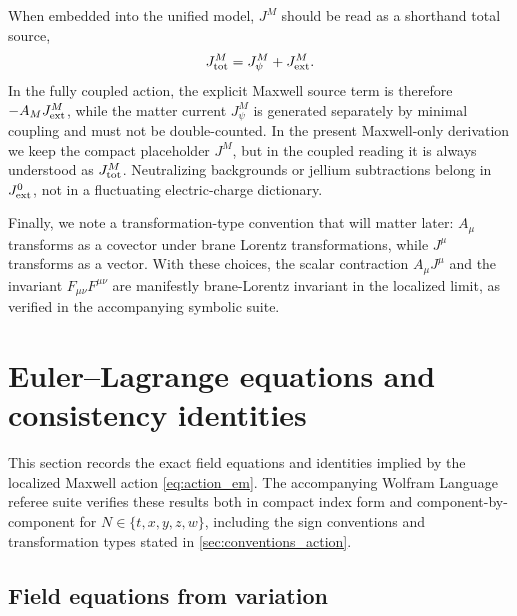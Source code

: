 \documentclass[11pt]{article}
\newcommand{\A}{A}
\newcommand{\F}{F}
\newcommand{\J}{J}
\newcommand{\Jpsi}{J_\psi}
\newcommand{\Jext}{J_{\rm ext}}
\newcommand{\Jtot}{J_{\rm tot}}
\begin{document}
When embedded into the unified model, \(\J^M\) should be read as a shorthand total
source,
\begin{equation}
  \Jtot^M = \Jpsi^M + \Jext^M.
\end{equation}
In the fully coupled action, the explicit Maxwell source term is therefore
\(-\A_M\Jext^M\), while the matter current \(\Jpsi^M\) is generated separately by
minimal coupling and must not be double-counted. In the present Maxwell-only
derivation we keep the compact placeholder \(\J^M\), but in the coupled reading it
is always understood as \(\Jtot^M\). Neutralizing backgrounds or jellium
subtractions belong in \(\Jext^0\), not in a fluctuating electric-charge
dictionary.

Finally, we note a transformation-type convention that will matter later:
\(\A_\mu\) transforms as a covector under brane Lorentz transformations, while
\(\J^\mu\) transforms as a vector. With these choices, the scalar contraction
\(\A_\mu \J^\mu\) and the invariant \(\F_{\mu\nu}\F^{\mu\nu}\) are manifestly
brane-Lorentz invariant in the localized limit, as verified in the accompanying
symbolic suite.

\section{Euler--Lagrange equations and consistency identities}
\label{sec:eom_identities}

This section records the exact field equations and identities implied by the
localized Maxwell action \cref{eq:action_em}. The accompanying Wolfram Language
referee suite verifies these results both in compact index form and
component-by-component for \(N\in\{t,x,y,z,w\}\), including the sign conventions
and transformation types stated in \cref{sec:conventions_action}.

\subsection{Field equations from variation}
\label{sec:eom}
\end{document}

